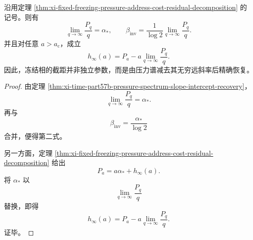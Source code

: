 \begin{corollary}\label{cor:xi-fixed-freezing-slope-intercept-inversion}
沿用定理 \ref{thm:xi-fixed-freezing-pressure-address-cost-residual-decomposition} 的记号。则有
\[
\boxed{\;
\lim_{q\to\infty}\frac{P_q}{q}=\alpha_*,
\qquad
\beta_{\mathrm{inv}}
=
\frac{1}{\log 2}\lim_{q\to\infty}\frac{P_q}{q}.\;}
\]
并且对任意 \(a>a_{\mathrm c}\)，成立
\[
\boxed{\;
h_\infty(a)
=
P_a-a\lim_{q\to\infty}\frac{P_q}{q}.\;}
\]
因此，冻结相的截距并非独立参数，而是由压力谱减去其无穷远斜率后精确恢复。
\end{corollary}
\begin{proof}
由定理 \ref{thm:xi-time-part57b-pressure-spectrum-slope-intercept-recovery}，
\[
\lim_{q\to\infty}\frac{P_q}{q}=\alpha_*.
\]
再与
\[
\beta_{\mathrm{inv}}=\frac{\alpha_*}{\log 2}
\]
合并，便得第二式。

另一方面，定理
\ref{thm:xi-fixed-freezing-pressure-address-cost-residual-decomposition}
给出
\[
P_a=a\alpha_*+h_\infty(a).
\]
将 \(\alpha_*\) 以
\[
\lim_{q\to\infty}\frac{P_q}{q}
\]
替换，即得
\[
h_\infty(a)
=
P_a-a\lim_{q\to\infty}\frac{P_q}{q}.
\]
证毕。
\end{proof}

